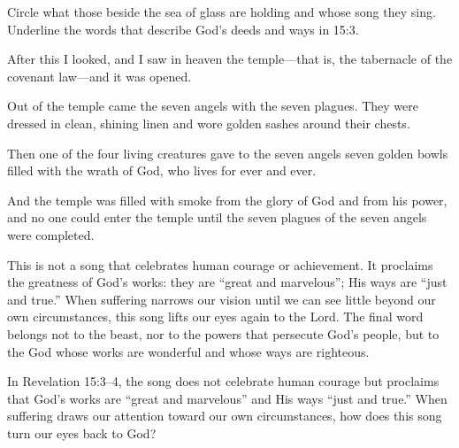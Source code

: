 \begin{ScriptureBox2}{Circle what those beside the sea of glass are holding and whose song they sing. Underline the words that describe God's deeds and ways in 15:3.}
\item[15:5] After this I looked, and I saw in heaven the temple---that is, the tabernacle of the covenant law---and it was opened.

\item[15:6] Out of the temple came the seven angels with the seven plagues. They were dressed in clean, shining linen and wore golden sashes around their chests.

\item[15:7] Then one of the four living creatures gave to the seven angels seven golden bowls filled with the wrath of God, who lives for ever and ever.

\item[15:8] And the temple was filled with smoke from the glory of God and from his power, and no one could enter the temple until the seven plagues of the seven angels were completed.

\end{ScriptureBox2}


This is not a song that celebrates human courage or achievement. It proclaims the greatness of God's works: they are “great and marvelous”; His ways are “just and true.” When suffering narrows our vision until we can see little beyond our own circumstances, this song lifts our eyes again to the Lord. The final word belongs not to the beast, nor to the powers that persecute God's people, but to the God whose works are wonderful and whose ways are righteous.


\begin{ReaderQuestion}
In Revelation 15:3--4, the song does not celebrate human courage but proclaims that God's works are “great and marvelous” and His ways “just and true.” When suffering draws our attention toward our own circumstances, how does this song turn our eyes back to God?
\end{ReaderQuestion}


